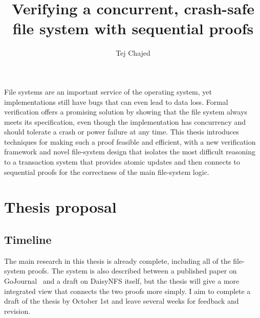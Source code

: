 \documentclass[fontsize=12pt,paper=letter,cleardoublepage=plain,twoside=false]{scrbook}
\title{Verifying a concurrent, crash-safe file system with sequential proofs}
\author{Tej Chajed}
\let\mainmatterorig\mainmatter
\renewcommand\mainmatter
 {\edef\p{\arabic{page}}%
  \mainmatterorig
  \setcounter{page}{\p+1+(\p-\p/2*2)}%
 }
\begin{document}
\frontmatter


\mainmatter

File systems are an important service of the operating system, yet
implementations still have bugs that can even lead to data loss. Formal
verification offers a promising solution by showing that the file system always
meets its specification, even though the implementation has concurrency and
should tolerate a crash or power failure at any time. This thesis introduces
techniques for making such a proof feasible and efficient, with a new
verification framework and novel file-system design that isolates the most
difficult reasoning to a transaction system that provides atomic updates and
then connects to sequential proofs for the correctness of the main file-system
logic.

\chapter{Thesis proposal}


\section{Timeline}
The main research in this thesis is already complete, including all of the
file-system proofs. The system is also described between a published paper on
GoJournal~\cite{chajed:gojournal} and a draft on DaisyNFS itself, but the thesis
will give a more integrated view that connects the two proofs more simply. I aim
to complete a draft of the thesis by October 1st and leave several weeks for
feedback and revision.

\backmatter

\begin{spacing}{1}
{}

\end{spacing}
\end{document}
